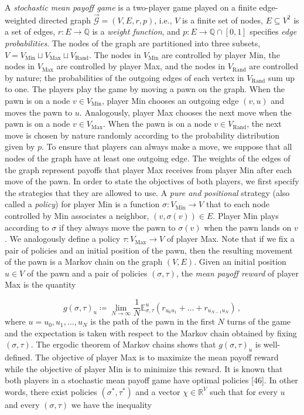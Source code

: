 \documentclass[10pt,a4paper]{article}
\theoremstyle{definition}
\begin{document}
A \emph{stochastic mean payoff game} is a two-player game played on a finite edge-weighted directed graph $\vec{\mathcal{G}}=(V,E,r,p)$, i.e., $V$ is a finite set of nodes, $E\subseteq V^{2}$ is a set of edges, $r\colon E\to{\mathbb{Q}}$ is a \emph{weight function}, and $p\colon E\to{\mathbb{Q}}\cap[0,1]$ specifies \emph{edge probabilities}. The nodes of the graph are partitioned into three subsets, $V=V_{\mathrm{Min}}\sqcup V_{\mathrm{Max}}\sqcup V_{\mathrm{Rand}}$. The nodes in $V_{\mathrm{Min}}$ are controlled by player Min, the nodes in $V_{\mathrm{Max}}$ are controlled by player Max, and the nodes in $V_{\mathrm{Rand}}$ are controlled by nature; the probabilities of the outgoing edges of each vertex in $V_{\mathrm{Rand}}$ sum up to one. The players play the game by moving a pawn on the graph. When the pawn is on a node $v\in V_{\mathrm{Min}}$, player Min chooses an outgoing edge $(v,u)$ and moves the pawn to $u$. Analogously, player Max chooses the next move when the pawn is on a node $v\in V_{\mathrm{Max}}$. When the pawn is on a node $v\in V_{\mathrm{Rand}}$, the next move is chosen by nature randomly according to the probability distribution given by $p$. To ensure that players can always make a move, we suppose that all nodes of the graph have at least one outgoing edge. The weights of the edges of the graph represent payoffs that player Max receives from player Min after each move of the pawn. In order to state the objectives of both players, we first specify the strategies that they are allowed to use. A \emph{pure and positional} strategy (also called a \emph{policy}) for player Min is a function $\sigma\colon V_{\mathrm{Min}}\to V$ that to each node controlled by Min associates a neighbor, $(v,\sigma(v))\in E$. Player Min plays according to $\sigma$ if they always move the pawn to $\sigma(v)$ when the pawn lands on $v$. We analogously define a policy $\tau\colon V_{\mathrm{Max}}\to V$ of player Max. Note that if we fix a pair of policies and an initial position of the pawn, then the resulting movement of the pawn is a Markov chain on the graph $(V,E)$. Given an initial position $u\in V$ of the pawn and a pair of policies $(\sigma,\tau)$, the \emph{mean payoff reward} of player Max is the quantity


\[
g(\sigma,\tau)_{u}\coloneqq\lim_{N\to\infty}\frac{1}{N}\mathbb{E}^{u}_{\sigma,\tau}(r_{u_{0}u_{1}}+\dots+r_{u_{N-1}u_{N}})\,,
\]
where $u=u_{0},u_{1},\dots,u_{N}$ is the path of the pawn in the first $N$ turns of the game and the expectation is taken with respect to the Markov chain obtained by fixing $(\sigma,\tau)$. The ergodic theorem of Markov chains shows that $g(\sigma,\tau)_{u}$ is well-defined. The objective of player Max is to maximize the mean payoff reward while the objective of player Min is to minimize this reward. It is known that both players in a stochastic mean payoff game have optimal policies [46]. In other words, there exist policies $(\sigma^{*},\tau^{*})$ and a vector $\chi\in\mathbb{R}^{V}$ such that for every $u$ and every $(\sigma,\tau)$ we have the inequality
\end{document}
